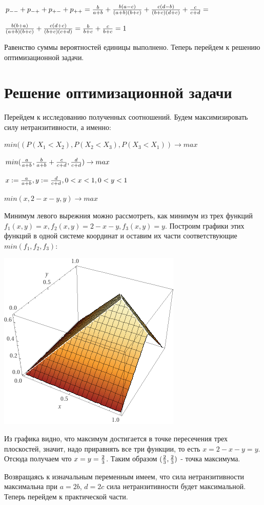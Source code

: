 \begin{center}
    $p_{--} + p_{-+} + p_{+-} + p_{++} = {b\over{a + b}} + {b(a-c)\over{(a + b)(b + c)}} + {c(d-b)\over{(b + c)(d + c)}} + {c\over{c + d}} = $
    
    ${b(b+a)\over{(a + b)(b+c)}} + {c(d+c)\over{(b + c)(c+d)}} = {b\over{b + c}} + {c\over{b + c}} = 1$
\end{center}
Равенство суммы вероятностей единицы выполнено. Теперь перейдем к решению оптимизационной задачи.

\section{Решение оптимизационной задачи}

Перейдем к исследованию полученных соотношений. Будем максимизировать силу нетранзитивности, а именно: 

\begin{center}
$min((P(X_1 < X_2), P(X_2 < X_3), P(X_3 < X_1)) \to max$

$min({a\over{a + b}}, {b\over{a + b}} + {c\over{c + d}}, {d\over{c + d}}) \to max$

$x := {a\over{a + b}}, y:= {d\over{c + d}}, 0 < x < 1, 0 < y < 1$

$min(x, 2 - x - y, y) \to max$

\end{center}

Минимум левого вырежния можно рассмотреть, как минимум из трех функций $f_1(x, y) = x, f_2(x,y) = 2 - x - y, f_3(x, y) = y$. Построим графики этих функций в одной системе координат и оставим их части соответствующие $min(f_1, f_2, f_3)$:

\begin{center}
    \includegraphics[keepaspectratio=true,scale=1]{images/chapter1/1.png}
\end{center}


Из графика видно, что максимум достигается в точке пересечения трех плоскостей, значит, надо приравнять все три функции, то есть $x = 2 - x - y = y$. Отсюда получаем что $x = y = {2 \over 3}$. Таким образом $({2 \over 3}, {2 \over 3})$  - точка максимума. 
\smallskip
\smallskip

Возвращаясь к изначальным переменным имеем, что сила нетранзитивности максимальна при $a = 2b$, $d = 2c$ сила нетранзитивности будет максимальной. Теперь перейдем к практической части.
